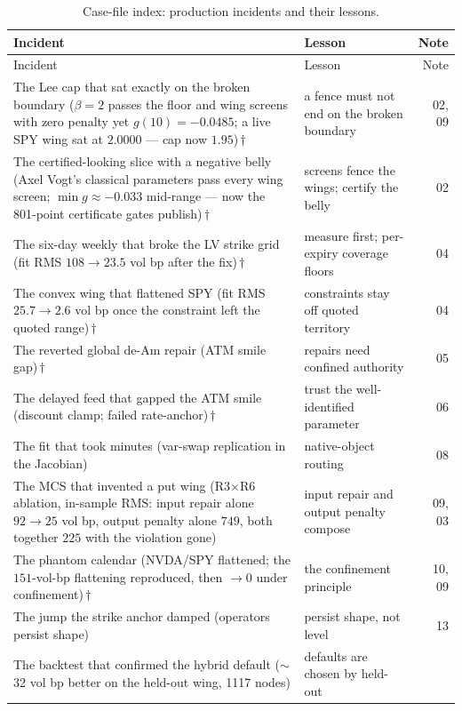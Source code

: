 \documentclass[11pt]{article}
\begin{document}
\begin{longtable}{p{}p{}r}
\caption{Case-file index: production incidents and their lessons.}\label{tab:casefiles}\\
\toprule Incident & Lesson & Note\\ \midrule
\endfirsthead \toprule Incident & Lesson & Note\\ \midrule \endhead
The Lee cap that sat exactly on the broken boundary ($\beta=2$ passes the
floor and wing screens with zero penalty yet $g(10)=-0.0485$; a live SPY
wing sat at $2.0000$ --- cap now $1.95$)\,$\dagger$ &
a fence must not end on the broken boundary & 02, 09\\
The certified-looking slice with a negative belly (Axel Vogt's classical
parameters pass every wing screen; $\min g\approx-0.033$ mid-range ---
now the 801-point certificate gates publish)\,$\dagger$ &
screens fence the wings; certify the belly & 02\\
The six-day weekly that broke the LV strike grid (fit RMS
$108\to23.5$ vol bp after the fix)\,$\dagger$ &
measure first; per-expiry coverage floors & 04\\
The convex wing that flattened SPY (fit RMS $25.7\to2.6$ vol bp once the
constraint left the quoted range)\,$\dagger$ &
constraints stay off quoted territory & 04\\
The reverted global de-Am repair (ATM smile gap)\,$\dagger$ &
repairs need confined authority & 05\\
The delayed feed that gapped the ATM smile (discount clamp; failed
rate-anchor)\,$\dagger$ & trust the well-identified parameter & 06\\
The fit that took minutes (var-swap replication in the Jacobian) &
native-object routing & 08\\
The MCS that invented a put wing (R3$\times$R6 ablation, in-sample RMS:
input repair alone $92\to25$ vol bp, output penalty alone $749$, both
together $225$ with the violation gone) & input repair and output penalty
compose & 09, 03\\
The phantom calendar (NVDA/SPY flattened; the $151$-vol-bp flattening
reproduced, then $\to0$ under confinement)\,$\dagger$ &
the confinement principle & 10, 09\\
The jump the strike anchor damped (operators persist shape) &
persist shape, not level & 13\\
The backtest that confirmed the hybrid default ($\sim$32 vol bp better on
the held-out wing, 1117 nodes) & defaults are chosen by held-out

\end{longtable}
\end{document}
